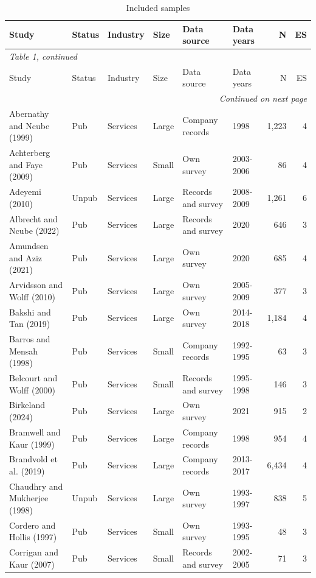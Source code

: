 \documentclass[11pt]{article}
\begin{document}
{\footnotesize
\setlength{\tabcolsep}{2.2pt}
\begin{longtable}{llllllrr}
\caption{Included samples}\\
\toprule
Study & Status & Industry & Size & Data source & Data years & N & ES \\
\midrule
\endfirsthead
\multicolumn{8}{l}{\textit{Table 1, continued}}\\
\toprule
Study & Status & Industry & Size & Data source & Data years & N & ES \\
\midrule
\endhead
\midrule
\multicolumn{8}{r}{\textit{Continued on next page}}\\
\endfoot
\bottomrule
\endlastfoot
Abernathy and Ncube (1999) & Pub & Services & Large & Company records & 1998 & 1,223 & 4 \\
Achterberg and Faye (2009) & Pub & Services & Small & Own survey & 2003-2006 & 86 & 4 \\
Adeyemi (2010) & Unpub & Services & Large & Records and survey & 2008-2009 & 1,261 & 6 \\
Albrecht and Ncube (2022) & Pub & Services & Large & Records and survey & 2020 & 646 & 3 \\
Amundsen and Aziz (2021) & Pub & Services & Large & Own survey & 2020 & 685 & 4 \\
Arvidsson and Wolff (2010) & Pub & Services & Large & Own survey & 2005-2009 & 377 & 3 \\
Bakshi and Tan (2019) & Pub & Services & Large & Own survey & 2014-2018 & 1,184 & 4 \\
Barros and Mensah (1998) & Pub & Services & Small & Company records & 1992-1995 & 63 & 3 \\
Belcourt and Wolff (2000) & Pub & Services & Small & Records and survey & 1995-1998 & 146 & 3 \\
Birkeland (2024) & Pub & Services & Large & Own survey & 2021 & 915 & 2 \\
Bramwell and Kaur (1999) & Pub & Services & Large & Company records & 1998 & 954 & 4 \\
Brandvold et al. (2019) & Pub & Services & Large & Company records & 2013-2017 & 6,434 & 4 \\
Chaudhry and Mukherjee (1998) & Unpub & Services & Large & Own survey & 1993-1997 & 838 & 5 \\
Cordero and Hollis (1997) & Pub & Services & Small & Own survey & 1993-1995 & 48 & 3 \\
Corrigan and Kaur (2007) & Pub & Services & Small & Records and survey & 2002-2005 & 71 & 3 \\

\end{longtable}}
\end{document}
